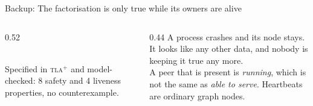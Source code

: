 \documentclass[10pt, aspectratio=169]{beamer}
\begin{document}
\begin{frame}{Backup: The factorisation is only true while its owners are alive}
  \begin{columns}[c]
    \begin{column}{0.52\textwidth}
      \centering
      \\[0.6em]
      \footnotesize Specified in \textsc{tla}$^+$ and model-checked: 8 safety and 4 liveness
      properties, no counterexample.
    \end{column}
    \begin{column}{0.44\textwidth}
      \small
      A process crashes and its node stays. It looks like any other data, and
      \alert{nobody is keeping it true any more}.\\[0.5em]
      A peer that is present is \emph{running}, which is not the same as \emph{able to serve}.
      Heartbeats are ordinary graph nodes.
    \end{column}
  \end{columns}
\end{frame}
\end{document}
